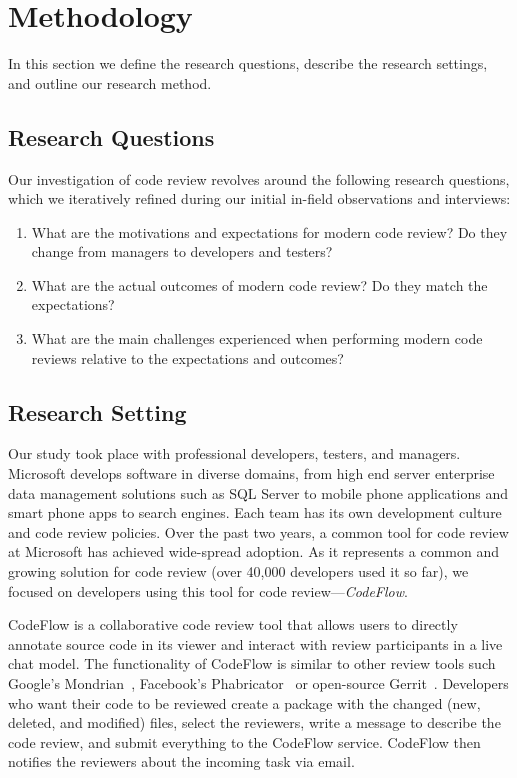 
\section{Methodology} \label{sec:methodology}


In this section we define the research questions, describe the research
settings, and outline our research method.

\subsection{Research Questions}

Our investigation of code review revolves around the following research
questions, which we iteratively refined during our initial in-field
observations and interviews:

\begin{enumerate}
  \item What are the motivations and expectations for modern code review? Do they change from managers to developers and testers?
  \item What are the actual outcomes of modern code review? Do they match the expectations?
  \item What are the main challenges experienced when performing modern code reviews relative to the expectations and outcomes?
\end{enumerate}

\subsection{Research Setting}

Our study took place with professional developers, testers, and managers.
Microsoft develops software in diverse domains, from high end server enterprise
data management solutions such as SQL Server to mobile phone applications and
smart phone apps to search engines. Each team has its own development culture
and code review policies. Over the past two years, a common tool for code
review at Microsoft has achieved wide-spread adoption. As it represents a
common and growing solution for code review (over 40,000 developers used it so
far), we focused on developers using this tool for code review---\emph{CodeFlow}. 

CodeFlow is a collaborative code review tool that allows users to directly
annotate source code in its viewer and interact with review participants in a
live chat model. The functionality of CodeFlow is similar to other review tools
such Google's Mondrian~\cite{kennedy2006online}, Facebook's Phabricator~\cite{tsotsis2011online} or
open-source Gerrit~\cite{gerrit2012online}. Developers who want their code to
be reviewed create a package with the changed (new, deleted, and modified)
files, select the reviewers, write a message to describe the code review, and
submit everything to the CodeFlow service. CodeFlow then notifies the reviewers
about the incoming task via email.



